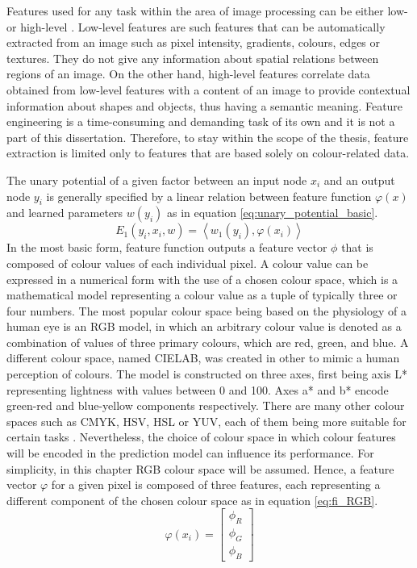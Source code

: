 Features used for any task within the area of image processing can be either low- or high-level \cite{feature_extraction_book}. Low-level features are such features that can be automatically extracted from an image such as pixel intensity, gradients, colours, edges or textures. They do not give any information about spatial relations between regions of an image. On the other hand, high-level features correlate data obtained from low-level features with a content of an image to provide contextual information about shapes and objects, thus having a semantic meaning. Feature engineering is a time-consuming and demanding task of its own and it is not a part of this dissertation. Therefore, to stay within the scope of the thesis, feature extraction is limited only to features that are based solely on colour-related data.

The unary potential of a given factor between an input node $x_i$ and an output node $y_i$ is generally specified by a linear relation between feature function $\varphi(x)$ and learned parameters $w(y_i)$ \cite{Nowozin} as in equation \ref{eq:unary_potential_basic}.
\begin{equation}
    \label{eq:unary_potential_basic}
    E_1(y_i,x_i,w) =  \left \langle w_1(y_i), \varphi(x_i) \right \rangle 
\end{equation}
In the most basic form, feature function outputs a feature vector $\phi$ that is composed of colour values of each individual pixel. A colour value can be expressed in a numerical form with the use of a chosen colour space, which is a mathematical model representing a colour value as a tuple of typically three or four numbers. The most popular colour space being based on the physiology of a human eye is an RGB model, in which an arbitrary colour value is denoted as a combination of values of three primary colours, which are red, green, and blue. A different colour space, named CIELAB, was created in other to mimic a human perception of colours. The model is constructed on three axes, first being axis L* representing lightness with values between 0 and 100. Axes a* and b* encode green-red and blue-yellow components respectively. There are many other colour spaces such as CMYK, HSV, HSL or YUV, each of them being more suitable for certain tasks \cite{colour_space}. Nevertheless, the choice of colour space in which colour features will be encoded in the prediction model can influence its performance. For simplicity, in this chapter RGB colour space will be assumed. Hence, a feature vector $\varphi$ for a given pixel is composed of three features, each representing a different component of the chosen colour space as in equation \ref{eq:fi_RGB}.
\begin{equation}
    \label{eq:fi_RGB}
    \varphi(x_i) = \begin{bmatrix}
        \phi_R\\ 
        \phi_G\\ 
        \phi_B
    \end{bmatrix}
\end{equation}


